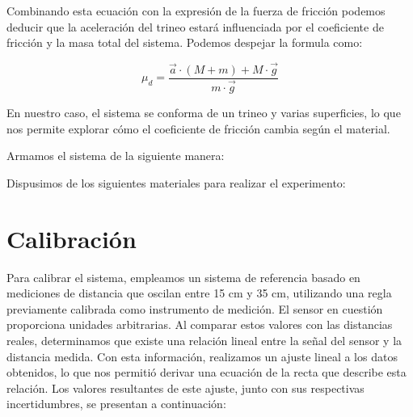 \documentclass[12pt,a4]{article}
\begin{document}
Combinando esta ecuación con la expresión de la fuerza de fricción podemos deducir que la aceleración del trineo estará influenciada por el coeficiente de fricción y la masa total del sistema. Podemos despejar la formula como:

\begin{equation}
    \mu_d = \frac{\vec{a} \cdot (M + m) + M \cdot \vec{g} }{m \cdot \vec{g}}
    \label{eq:mu_d}
\end{equation}

En nuestro caso, el sistema se conforma de un trineo y varias superficies, lo que nos permite explorar cómo el coeficiente de fricción cambia según el material.

Armamos el sistema de la siguiente manera:

Dispusimos de los siguientes materiales para realizar el experimento:


\section{Calibración}

Para calibrar el sistema, empleamos un sistema de referencia basado en mediciones de distancia que oscilan entre 15 cm y 35 cm, utilizando una regla previamente calibrada como
 instrumento de medición. El sensor en cuestión proporciona unidades arbitrarias. Al comparar estos valores con las distancias reales, determinamos que existe una relación lineal
  entre la señal del sensor y la distancia medida. Con esta información, realizamos un ajuste lineal a los datos obtenidos, lo que nos permitió derivar una ecuación de la recta que
   describe esta relación. Los valores resultantes de este ajuste, junto con sus respectivas incertidumbres, se presentan a continuación:
\end{document}
